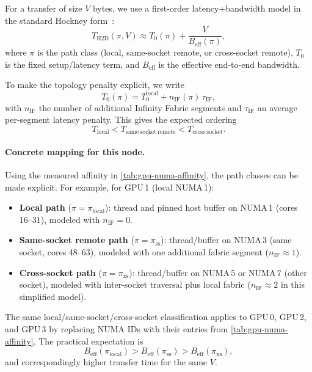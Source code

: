 For a transfer of size $V$ bytes, we use a first-order latency+bandwidth model
in the standard Hockney form~\cite{hockney1988parallel}:
\[
  T_{\mathrm{H2D}}(\pi, V)
  \approx
  T_0(\pi) + \frac{V}{B_{\mathrm{eff}}(\pi)},
\]
where $\pi$ is the path class (local, same-socket remote, or cross-socket
remote), $T_0$ is the fixed setup/latency term, and $B_{\mathrm{eff}}$ is the
effective end-to-end bandwidth.

To make the topology penalty explicit, we write
\[
  T_0(\pi) = T_0^{\mathrm{local}} + n_{\mathrm{IF}}(\pi)\,\tau_{\mathrm{IF}},
\]
with $n_{\mathrm{IF}}$ the number of additional Infinity Fabric segments and
$\tau_{\mathrm{IF}}$ an average per-segment latency penalty. This gives the
expected ordering
\[
  T_{\mathrm{local}} < T_{\mathrm{same\ socket\ remote}} < T_{\mathrm{cross\ socket}}.
\]

\paragraph{Concrete mapping for this node.}
Using the measured affinity in \cref{tab:gpu-numa-affinity}, the path classes
can be made explicit. For example, for GPU\,1 (local NUMA\,1):
\begin{itemize}
  \item \textbf{Local path} ($\pi=\pi_{\mathrm{local}}$):
    thread and pinned host buffer on NUMA\,1 (cores 16--31),
    modeled with $n_{\mathrm{IF}}=0$.
  \item \textbf{Same-socket remote path} ($\pi=\pi_{\mathrm{ss}}$):
    thread/buffer on NUMA\,3 (same socket, cores 48--63),
    modeled with one additional fabric segment ($n_{\mathrm{IF}}\approx 1$).
  \item \textbf{Cross-socket path} ($\pi=\pi_{\mathrm{xs}}$):
    thread/buffer on NUMA\,5 or NUMA\,7 (other socket),
    modeled with inter-socket traversal plus local fabric
    ($n_{\mathrm{IF}}\approx 2$ in this simplified model).
\end{itemize}
The same local/same-socket/cross-socket classification applies to GPU\,0, GPU\,2,
and GPU\,3 by replacing NUMA IDs with their entries from
\cref{tab:gpu-numa-affinity}. The practical expectation is
\[
  B_{\mathrm{eff}}(\pi_{\mathrm{local}})
  >
  B_{\mathrm{eff}}(\pi_{\mathrm{ss}})
  >
  B_{\mathrm{eff}}(\pi_{\mathrm{xs}}),
\]
and correspondingly higher transfer time for the same $V$.

